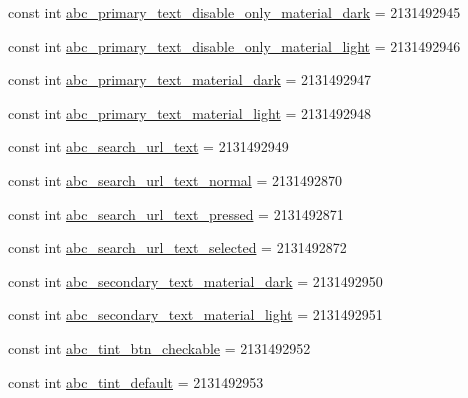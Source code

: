 \begin{DoxyCompactItemize}
\item 
const int \mbox{\hyperlink{class_f_w_p_s___app_1_1_droid_1_1_resource_1_1_color_a3c4cc9966f0f5cb6d2ef8acba034ee1b}{abc\+\_\+primary\+\_\+text\+\_\+disable\+\_\+only\+\_\+material\+\_\+dark}} = 2131492945
\item 
const int \mbox{\hyperlink{class_f_w_p_s___app_1_1_droid_1_1_resource_1_1_color_a1895c256c7298a1ea56659baeca17193}{abc\+\_\+primary\+\_\+text\+\_\+disable\+\_\+only\+\_\+material\+\_\+light}} = 2131492946
\item 
const int \mbox{\hyperlink{class_f_w_p_s___app_1_1_droid_1_1_resource_1_1_color_ad676d27ba2b56eeaf211de4f7fb7f3b5}{abc\+\_\+primary\+\_\+text\+\_\+material\+\_\+dark}} = 2131492947
\item 
const int \mbox{\hyperlink{class_f_w_p_s___app_1_1_droid_1_1_resource_1_1_color_a46dc7b33a4cc97321fe1cde5a880412b}{abc\+\_\+primary\+\_\+text\+\_\+material\+\_\+light}} = 2131492948
\item 
const int \mbox{\hyperlink{class_f_w_p_s___app_1_1_droid_1_1_resource_1_1_color_a355a35ef8b371022955e93de7a283232}{abc\+\_\+search\+\_\+url\+\_\+text}} = 2131492949
\item 
const int \mbox{\hyperlink{class_f_w_p_s___app_1_1_droid_1_1_resource_1_1_color_a90a99ae5d5997456872e95a0befefabf}{abc\+\_\+search\+\_\+url\+\_\+text\+\_\+normal}} = 2131492870
\item 
const int \mbox{\hyperlink{class_f_w_p_s___app_1_1_droid_1_1_resource_1_1_color_a1ca68e0d2166c5d66eea0e7fc6b2d1a4}{abc\+\_\+search\+\_\+url\+\_\+text\+\_\+pressed}} = 2131492871
\item 
const int \mbox{\hyperlink{class_f_w_p_s___app_1_1_droid_1_1_resource_1_1_color_a13d1ffde39307a12a1a0dbead2e9267e}{abc\+\_\+search\+\_\+url\+\_\+text\+\_\+selected}} = 2131492872
\item 
const int \mbox{\hyperlink{class_f_w_p_s___app_1_1_droid_1_1_resource_1_1_color_a93a1f92953303d565dff3b952245be15}{abc\+\_\+secondary\+\_\+text\+\_\+material\+\_\+dark}} = 2131492950
\item 
const int \mbox{\hyperlink{class_f_w_p_s___app_1_1_droid_1_1_resource_1_1_color_a0934a8e27544d7c7a42e89651c04e825}{abc\+\_\+secondary\+\_\+text\+\_\+material\+\_\+light}} = 2131492951
\item 
const int \mbox{\hyperlink{class_f_w_p_s___app_1_1_droid_1_1_resource_1_1_color_ac1e161858ffaf10f2f84fb33715eef25}{abc\+\_\+tint\+\_\+btn\+\_\+checkable}} = 2131492952
\item 
const int \mbox{\hyperlink{class_f_w_p_s___app_1_1_droid_1_1_resource_1_1_color_a503db14d318f542b647d3d94ea867375}{abc\+\_\+tint\+\_\+default}} = 2131492953

\end{DoxyCompactItemize}
